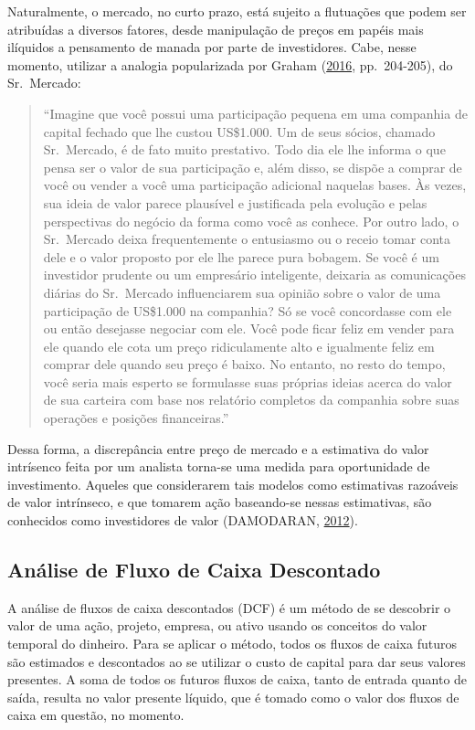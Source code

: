 \documentclass[aprovado,numbers]{coppe}
\begin{document}
  Naturalmente, o mercado, no curto prazo, está sujeito a flutuações que podem ser atribuídas a diversos fatores, desde manipulação de preços em papéis mais ilíquidos a pensamento de manada por parte de investidores. Cabe, nesse momento, utilizar a analogia popularizada por Graham (\protect\hyperlink{ref-graham2016}{2016}, pp.~204-205), do Sr.~Mercado:
  \begin{quote}
  ``Imagine que você possui uma participação pequena em uma companhia de capital fechado que lhe custou US\$1.000. Um de seus sócios, chamado Sr.~Mercado, é de fato muito prestativo. Todo dia ele lhe informa o que pensa ser o valor de sua participação e, além disso, se dispõe a comprar de você ou vender a você uma participação adicional naquelas bases. Às vezes, sua ideia de valor parece plausível e justificada pela evolução e pelas perspectivas do negócio da forma como você as conhece. Por outro lado, o Sr.~Mercado deixa frequentemente o entusiasmo ou o receio tomar conta dele e o valor proposto por ele lhe parece pura bobagem. Se você é um investidor prudente ou um empresário inteligente, deixaria as comunicações diárias do Sr.~Mercado influenciarem sua opinião sobre o valor de uma participação de US\$1.000 na companhia? Só se você concordasse com ele ou então desejasse negociar com ele. Você pode ficar feliz em vender para ele quando ele cota um preço ridiculamente alto e igualmente feliz em comprar dele quando seu preço é baixo. No entanto, no resto do tempo, você seria mais esperto se formulasse suas próprias ideias acerca do valor de sua carteira com base nos relatório completos da companhia sobre suas operações e posições financeiras.''
  \end{quote}
  Dessa forma, a discrepância entre preço de mercado e a estimativa do valor intrísenco feita por um analista torna-se uma medida para oportunidade de investimento. Aqueles que considerarem tais modelos como estimativas razoáveis de valor intrínseco, e que tomarem ação baseando-se nessas estimativas, são conhecidos como investidores de valor (DAMODARAN, \protect\hyperlink{ref-damodaran2012}{2012}).

  \hypertarget{anuxe1lise-de-fluxo-de-caixa-descontado}{%
  \subsection{Análise de Fluxo de Caixa Descontado}\label{anuxe1lise-de-fluxo-de-caixa-descontado}}

  A análise de fluxos de caixa descontados (DCF) é um método de se descobrir o valor de uma ação, projeto, empresa, ou ativo usando os conceitos do valor temporal do dinheiro. Para se aplicar o método, todos os fluxos de caixa futuros são estimados e descontados ao se utilizar o custo de capital para dar seus valores presentes. A soma de todos os futuros fluxos de caixa, tanto de entrada quanto de saída, resulta no valor presente líquido, que é tomado como o valor dos fluxos de caixa em questão, no momento.
\end{document}
